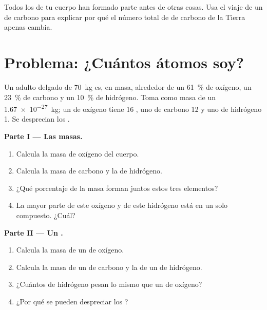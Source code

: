 \begin{exercise}[$\star\star\star$]\label{exo:g9:elements-universe-earth:12}
Todos los  de tu cuerpo han formado parte antes de otras cosas.
Usa el viaje de un  de carbono para explicar por qué el número
total de  de carbono de la Tierra apenas cambia.
\end{exercise}

\section{Problema: ¿Cuántos átomos soy?}

\begin{problem}
\label{pb:g9:elements-universe-earth:1}
Un adulto delgado de \qty{70}{kg} es, en masa, alrededor de un
\qty{61}{\percent} de oxígeno, un \qty{23}{\percent} de carbono y un
\qty{10}{\percent} de hidrógeno. Toma como masa de un 
\qty{1.67e-27}{kg}; un  de oxígeno tiene 16 , uno de
carbono 12 y uno de hidrógeno 1. Se desprecian los .

\medskip
\noindent\textbf{Parte I --- Las masas.}
\begin{enumerate}
  \item Calcula la masa de oxígeno del cuerpo.
  \item Calcula la masa de carbono y la de hidrógeno.
  \item ¿Qué porcentaje de la masa forman juntos estos tres elementos?
  \item La mayor parte de este oxígeno y de este hidrógeno está en un
        solo compuesto. ¿Cuál?
\end{enumerate}

\medskip
\noindent\textbf{Parte II --- Un .}
\begin{enumerate}[resume]
  \item Calcula la masa de un  de oxígeno.
  \item Calcula la masa de un  de carbono y la de un  de
        hidrógeno.
  \item ¿Cuántos  de hidrógeno pesan lo mismo que un  de
        oxígeno?
  \item ¿Por qué se pueden despreciar los ?
\end{enumerate}


\end{problem}
